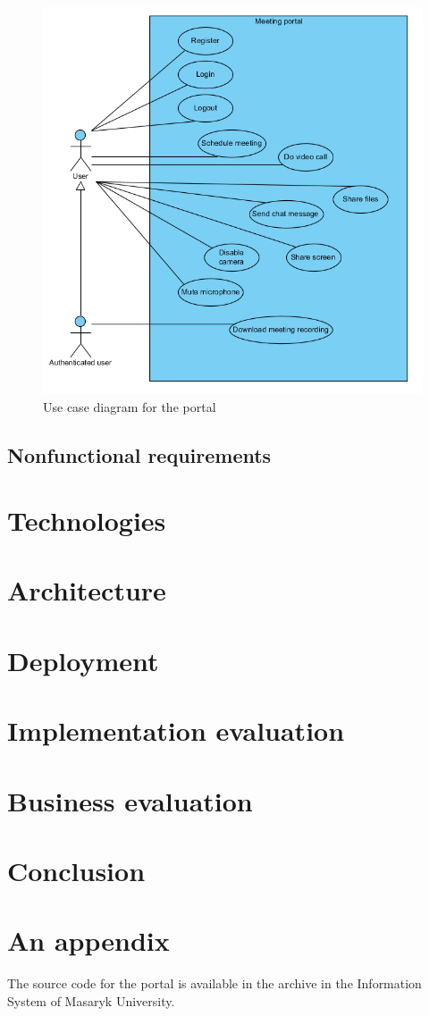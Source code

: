 \documentclass[
  digital, %
  table,   %
  lof,     %
  nolot,     %
]{fithesis3}
\begin{document}
\begin{figure}
  \begin{center}
    \includegraphics[scale=0.7]{diagrams/use_case.png}
  \end{center}
  \caption{Use case diagram for the portal}
  \label{fig:useCase}
\end{figure}

\section{Nonfunctional requirements}

\chapter{Technologies}

\chapter{Architecture}

\chapter{Deployment}

\chapter{Implementation evaluation}

\chapter{Business evaluation}

\chapter{Conclusion}

\printbibliography[heading=bibintoc] %

\appendix %
\chapter{An appendix}
The source code for the portal is available in the archive in the Information System of Masaryk University.
\end{document}
